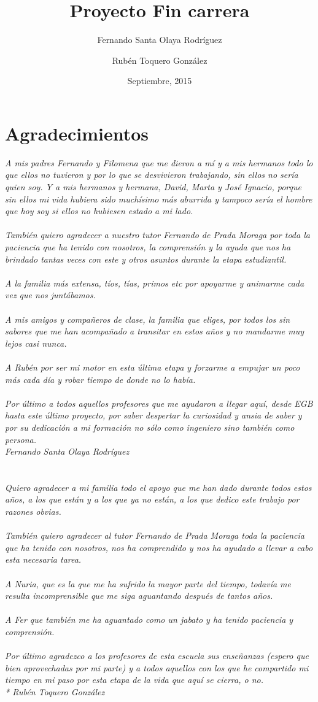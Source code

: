 \documentclass[b5paper,10pt,twoside]{book}
\title{Proyecto Fin carrera}
\author{Fernando Santa Olaya Rodríguez \\
	\and 
	Rubén Toquero González}
\date{Septiembre, 2015}
\begin{document}
	

	\chapter*{Agradecimientos}

	
	\textit{A mis padres Fernando y Filomena que me dieron a mí y a mis hermanos todo lo que ellos no tuvieron y por lo que se desvivieron trabajando, sin ellos no sería quien soy. Y a mis hermanos y hermana, David, Marta y José Ignacio, porque sin ellos mi vida hubiera sido muchísimo más aburrida y tampoco sería el hombre que hoy soy si ellos no hubiesen estado a mi lado.\\\\
		También quiero agradecer a nuestro tutor Fernando de Prada Moraga por toda la paciencia que ha tenido con nosotros, la comprensión y la ayuda que nos ha brindado tantas veces con este y otros asuntos durante la etapa estudiantil.\\\\
		A la familia más extensa, tíos, tías, primos etc por apoyarme y animarme cada vez que nos juntábamos.\\\\
		A mis amigos y compañeros de clase, la familia que eliges, por todos los sin sabores que me han acompañado a transitar en estos años y no mandarme muy lejos casi nunca.\\\\
		A Rubén por ser mi motor en esta última etapa y forzarme a empujar un poco más cada día y robar tiempo de donde no lo había.\\\\
		Por último a todos aquellos profesores que me ayudaron a llegar aquí, desde EGB hasta este último proyecto, por saber despertar la curiosidad y ansia de saber y por su dedicación a mi formación no sólo como ingeniero sino también como persona.\\
		Fernando Santa Olaya Rodríguez\\\\\\
		Quiero agradecer a mi familia todo el apoyo que me han dado durante todos estos años, a los que están y a los que ya no están, a los que dedico este trabajo por razones obvias.\\\\
		También quiero agradecer al tutor Fernando de Prada Moraga toda la paciencia que ha tenido con nosotros, nos ha comprendido y nos ha ayudado a llevar a cabo esta necesaria tarea.\\\\
		A Nuria, que es la que me ha sufrido la mayor parte del tiempo, todavía me resulta incomprensible que me siga aguantando después de tantos años.\\\\
		A Fer que también me ha aguantado como un jabato y ha tenido paciencia y comprensión.\\\\
		Por último agradezco a los profesores de esta escuela sus enseñanzas (espero que bien aprovechadas por mi parte) y a todos aquellos con los que he compartido mi tiempo en mi paso por esta etapa de la vida que aquí se cierra, o no.\\*
		Rubén Toquero González} 
\end{document}
